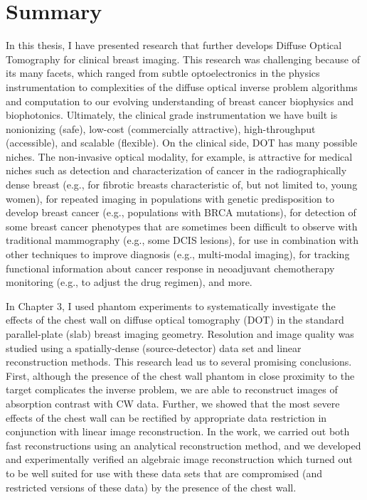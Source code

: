 \chapter{Summary}
In this thesis, I have presented research that further develops Diffuse Optical Tomography for clinical breast imaging. This research was challenging because of its many facets, which ranged from subtle optoelectronics in the physics instrumentation to complexities of the diffuse optical inverse problem algorithms and computation to our evolving understanding of breast cancer biophysics and biophotonics.  Ultimately, the clinical grade instrumentation we have built is nonionizing (safe), low-cost (commercially attractive), high-throughput (accessible), and scalable (flexible). On the clinical side, DOT has many possible niches. The non-invasive optical modality, for example, is attractive for medical niches such as detection and characterization of cancer in the radiographically dense breast (e.g., for fibrotic breasts characteristic of, but not limited to, young women), for repeated imaging in populations with genetic predisposition to develop breast cancer (e.g., populations with BRCA mutations), for detection of some breast cancer phenotypes that are sometimes been difficult to observe with traditional mammography (e.g., some DCIS lesions), for use in combination with other techniques to improve diagnosis (e.g., multi-modal imaging), for tracking functional information about cancer response in neoadjuvant chemotherapy monitoring (e.g., to adjust the drug regimen), and more.

In Chapter 3, I used phantom experiments to systematically investigate the effects of the chest wall on diffuse optical tomography (DOT) in the standard parallel-plate (slab) breast imaging geometry. Resolution and image quality was studied using a spatially-dense (source-detector) data set and linear reconstruction methods. This research lead us to several promising conclusions. First, although the presence of the chest wall phantom in close proximity to the target complicates the inverse problem, we are able to reconstruct images of absorption contrast with CW data. Further, we showed that the most severe effects of the chest wall can be rectified by appropriate data restriction in conjunction with linear image reconstruction. In the work, we carried out both fast reconstructions using an analytical reconstruction method, and we developed and experimentally verified an algebraic image reconstruction which turned out to be well suited for use with these data sets that are compromised (and restricted versions of these data) by the presence of the chest wall.

